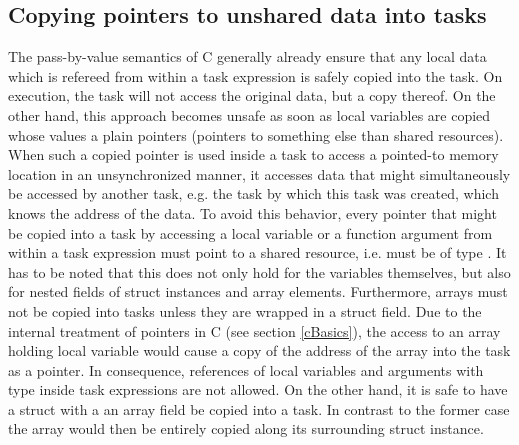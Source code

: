 \subsection{Copying pointers to unshared data into tasks}
The pass-by-value semantics of C generally already ensure that any local data which is refereed from within a task expression is safely copied into the task. On execution, the task will not access the original data, but a copy thereof. On the other hand, this approach becomes unsafe as soon as local variables are copied whose values a plain pointers (pointers to something else than shared resources). When such a copied pointer is used inside a task to access a pointed-to memory location in an unsynchronized manner, it accesses data that might simultaneously be accessed by another task, e.g. the task by which this task was created, which knows the address of the data. To avoid this behavior, every pointer that might be copied into a task by accessing a local variable or a function argument from within a task expression must point to a shared resource, i.e. must be of type . It has to be noted that this does not only hold for the variables themselves, but also for nested fields of struct instances and array elements. Furthermore, arrays must not be copied into tasks unless they are wrapped in a struct field. Due to the internal treatment of pointers in C (see section \ref{cBasics}), the access to an array holding local variable would cause a copy of the address of the array into the task as a pointer. In consequence, references of local variables and arguments with type  inside task expressions are not allowed. On the other hand, it is safe to have a struct with a an array field be copied into a task. In contrast to the former case the array would then be entirely copied along its surrounding struct instance.

